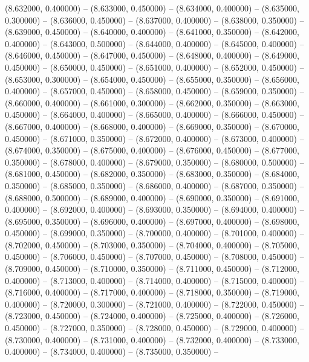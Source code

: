 (8.632000, 0.400000) -- 
(8.633000, 0.450000) -- 
(8.634000, 0.400000) -- 
(8.635000, 0.300000) -- 
(8.636000, 0.450000) -- 
(8.637000, 0.400000) -- 
(8.638000, 0.350000) -- 
(8.639000, 0.450000) -- 
(8.640000, 0.400000) -- 
(8.641000, 0.350000) -- 
(8.642000, 0.400000) -- 
(8.643000, 0.500000) -- 
(8.644000, 0.400000) -- 
(8.645000, 0.400000) -- 
(8.646000, 0.450000) -- 
(8.647000, 0.450000) -- 
(8.648000, 0.400000) -- 
(8.649000, 0.450000) -- 
(8.650000, 0.450000) -- 
(8.651000, 0.400000) -- 
(8.652000, 0.450000) -- 
(8.653000, 0.300000) -- 
(8.654000, 0.450000) -- 
(8.655000, 0.350000) -- 
(8.656000, 0.400000) -- 
(8.657000, 0.450000) -- 
(8.658000, 0.450000) -- 
(8.659000, 0.350000) -- 
(8.660000, 0.400000) -- 
(8.661000, 0.300000) -- 
(8.662000, 0.350000) -- 
(8.663000, 0.450000) -- 
(8.664000, 0.400000) -- 
(8.665000, 0.400000) -- 
(8.666000, 0.450000) -- 
(8.667000, 0.400000) -- 
(8.668000, 0.400000) -- 
(8.669000, 0.350000) -- 
(8.670000, 0.450000) -- 
(8.671000, 0.350000) -- 
(8.672000, 0.400000) -- 
(8.673000, 0.400000) -- 
(8.674000, 0.350000) -- 
(8.675000, 0.400000) -- 
(8.676000, 0.450000) -- 
(8.677000, 0.350000) -- 
(8.678000, 0.400000) -- 
(8.679000, 0.350000) -- 
(8.680000, 0.500000) -- 
(8.681000, 0.450000) -- 
(8.682000, 0.350000) -- 
(8.683000, 0.350000) -- 
(8.684000, 0.350000) -- 
(8.685000, 0.350000) -- 
(8.686000, 0.400000) -- 
(8.687000, 0.350000) -- 
(8.688000, 0.500000) -- 
(8.689000, 0.400000) -- 
(8.690000, 0.350000) -- 
(8.691000, 0.400000) -- 
(8.692000, 0.400000) -- 
(8.693000, 0.350000) -- 
(8.694000, 0.400000) -- 
(8.695000, 0.350000) -- 
(8.696000, 0.400000) -- 
(8.697000, 0.400000) -- 
(8.698000, 0.450000) -- 
(8.699000, 0.350000) -- 
(8.700000, 0.400000) -- 
(8.701000, 0.400000) -- 
(8.702000, 0.450000) -- 
(8.703000, 0.350000) -- 
(8.704000, 0.400000) -- 
(8.705000, 0.450000) -- 
(8.706000, 0.450000) -- 
(8.707000, 0.450000) -- 
(8.708000, 0.450000) -- 
(8.709000, 0.450000) -- 
(8.710000, 0.350000) -- 
(8.711000, 0.450000) -- 
(8.712000, 0.400000) -- 
(8.713000, 0.400000) -- 
(8.714000, 0.400000) -- 
(8.715000, 0.400000) -- 
(8.716000, 0.400000) -- 
(8.717000, 0.400000) -- 
(8.718000, 0.350000) -- 
(8.719000, 0.400000) -- 
(8.720000, 0.300000) -- 
(8.721000, 0.400000) -- 
(8.722000, 0.450000) -- 
(8.723000, 0.450000) -- 
(8.724000, 0.400000) -- 
(8.725000, 0.400000) -- 
(8.726000, 0.450000) -- 
(8.727000, 0.350000) -- 
(8.728000, 0.450000) -- 
(8.729000, 0.400000) -- 
(8.730000, 0.400000) -- 
(8.731000, 0.400000) -- 
(8.732000, 0.400000) -- 
(8.733000, 0.400000) -- 
(8.734000, 0.400000) -- 
(8.735000, 0.350000) -- 
